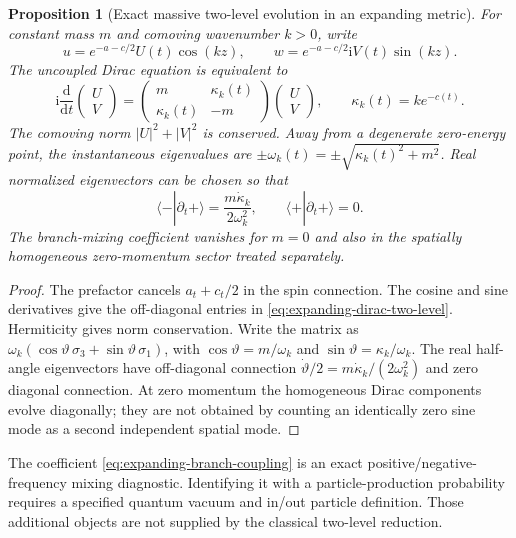 \documentclass[11pt,a4paper,oneside]{book}
\theoremstyle{plain}
\newtheorem{proposition}[theorem]{Proposition}
\theoremstyle{definition}
\theoremstyle{remark}
\newcommand{\dd}{\mathrm d}
\newcommand{\ii}{\mathrm i}
\newcommand{\src}[2]{\cite{#1}}
\begin{document}
\begin{proposition}[Exact massive two-level evolution in an expanding metric]
\label{prop:expanding-dirac-mode}
For constant mass $m$ and comoving wavenumber $k>0$, write
\[
 u=e^{-a-c/2}U(t)\cos(kz),\qquad
 w=e^{-a-c/2}\ii V(t)\sin(kz).
\]
The uncoupled Dirac equation is equivalent to
\begin{equation}
 \ii\frac{\dd}{\dd t}\begin{pmatrix}U\\V\end{pmatrix}
 =\begin{pmatrix}m&\kappa_k(t)\\\kappa_k(t)&-m\end{pmatrix}
       \begin{pmatrix}U\\V\end{pmatrix},
 \qquad \kappa_k(t)=ke^{-c(t)}.
 \label{eq:expanding-dirac-two-level}
\end{equation}
The comoving norm $|U|^2+|V|^2$ is conserved.  Away from a degenerate
zero-energy point, the instantaneous eigenvalues are
$\pm\omega_k(t)=\pm\sqrt{\kappa_k(t)^2+m^2}$.  Real normalized
eigenvectors can be chosen so that
\begin{equation}
 \langle-|\partial_t+\rangle=\frac{m\dot\kappa_k}{2\omega_k^2},
 \qquad \langle+|\partial_t+\rangle=0.
 \label{eq:expanding-branch-coupling}
\end{equation}
The branch-mixing coefficient vanishes for $m=0$ and also in the
spatially homogeneous zero-momentum sector treated separately.
\end{proposition}
\begin{proof}
The prefactor cancels $a_t+c_t/2$ in the spin connection.
The cosine and sine derivatives give the off-diagonal entries in
\eqref{eq:expanding-dirac-two-level}.  Hermiticity gives norm
conservation.  Write the matrix as
$\omega_k(\cos\vartheta\,\sigma_3+\sin\vartheta\,\sigma_1)$, with
$\cos\vartheta=m/\omega_k$ and $\sin\vartheta=\kappa_k/\omega_k$.
The real half-angle eigenvectors have off-diagonal connection
$\dot\vartheta/2=m\dot\kappa_k/(2\omega_k^2)$ and zero diagonal
connection.  At zero momentum the homogeneous Dirac components evolve
diagonally; they are not obtained by counting an identically zero sine
mode as a second independent spatial mode.
\end{proof}
\src{R20}{thm:v20v37-twolevel}

The coefficient \eqref{eq:expanding-branch-coupling} is an exact
positive/negative-frequency mixing diagnostic.  Identifying it with a
particle-production probability requires a specified quantum vacuum and
in/out particle definition.  Those additional objects are not supplied
by the classical two-level reduction.
\end{document}
